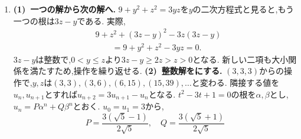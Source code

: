 \begin{enumerate}[label=\textbf{問\arabic*.},leftmargin=3.8em,format=\bookitemlink{practice-entrance}{solution}{problem}]
                  よって,
                  \[
                    \begin{aligned}
                    a_m\mid a_n&\ \Longleftrightarrow\ a_r=0\\
                      &\ \Longleftrightarrow\ r=0\ \Longleftrightarrow\ m\mid n.
                    \end{aligned}
                  \]
                  $m=1$でも$r=0$なので成り立つ.(1)は$a_3=5$を用いた$m=3$の場合に当たる.
                  \smallskip\textbf{(3)~項から添字の互除法へ.}
                  $a_n-a_r$は$a_m$の倍数なので,共通の約数は変わらず,
                  \[
                    \gcd(a_m,a_n)=\gcd(a_m,a_r).
                  \]
                  \[
                    \gcd(a_m,a_n)=\gcd(a_d,a_0)=a_d.
                  \]
                  最後は$a_0=0$と$\gcd(x,0)=x$を使った.
                  例では$3040=2026+1014$, $2026=1014+1012$, $1014=1012+2$, $1012=506\cdot2$より$d=2$である.
                  したがって$\gcd(a_{2026},a_{3040})=a_2=2$となる.
                  巨大な項どうしの整除関係を,小さな添字の計算へ移せた.
          \item \textbf{(1)~一つの解から次の解へ.}
                  $9+y^2+z^2=3yz$を$y$の二次方程式と見ると,もう一つの根は$3z-y$である.
                  実際,
                  \[
                    \begin{aligned}
                    &9+z^2+(3z-y)^2-3z(3z-y)\\
                    &\qquad=9+y^2+z^2-3yz=0.
                    \end{aligned}
                  \]
                  $3z-y$は整数で,$0<y\le z$より$3z-y\ge2z>z>0$となる.
                  新しい二項も大小関係を満たすため,操作を繰り返せる.
                  \smallskip\textbf{(2)~整数解をにする.}
                  $(3,3,3)$からの操作で,$y,z$は$(3,3),(3,6),(6,15),(15,39),\ldots$と変わる.
                  隣接する値を$u_n,u_{n+1}$とすれば$u_{n+2}=3u_{n+1}-u_n$となる.
                  $t^2-3t+1=0$の根を$\alpha,\beta$とし,
                  $u_n=P\alpha^n+Q\beta^n$とおく.
                  $u_0=u_1=3$から,
                  \[
                    P=\frac{3(\sqrt5-1)}{2\sqrt5},\quad
                    Q=\frac{3(\sqrt5+1)}{2\sqrt5}
\]
\end{enumerate}
